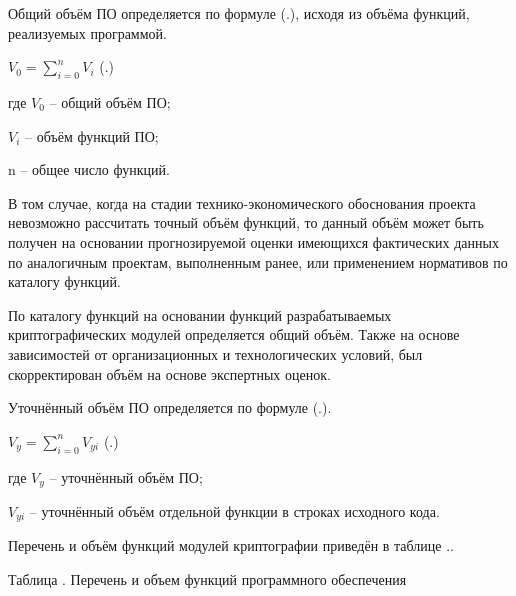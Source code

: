 \subtitlespace

{\gostFont
	
	\par \redline Общий объём ПО определяется по формуле (\thechaptercntr .\theformulacntr), исходя из объёма функций, реализуемых программой. 
	
	\formulaspace \par \redline 
	$V_0=\sum_{i=0}^{n}V_i$ 
	\hfill (\thechaptercntr .\theformulacntr) \redline
	\formulaspace \addtocounter{formulacntr}{1}

	\par \redline где $V_0$ {--} общий объём ПО;
	\par \redline \wherespace $V_i$ {--} объём функций ПО;
	\par \redline \wherespace n {--} общее число функций.
	
	\par \redline В том случае, когда на стадии технико-экономического обоснования проекта невозможно рассчитать точный объём функций, то данный объём может быть получен на основании прогнозируемой оценки имеющихся фактических данных по аналогичным проектам, выполненным ранее, или применением нормативов по каталогу функций.
	
	\par \redline По каталогу функций на основании функций разрабатываемых криптографических модулей определяется общий объём. Также на основе зависимостей от организационных и технологических условий, был скорректирован объём на основе экспертных оценок.
	
	\par \redline Уточнённый объём ПО определяется по формуле (\thechaptercntr .\theformulacntr).
	
	\formulaspace \par \redline 
	$V_y=\sum_{i=0}^{n}V_{yi}$ 
	\hfill (\thechaptercntr .\theformulacntr) \redline
	\formulaspace \addtocounter{formulacntr}{1}
	
	\par \redline где $V_y$ {--} уточнённый объём ПО;
	\par \redline \wherespace $V_{yi}$ {--} уточнённый объём отдельной функции в строках исходного кода.
	
	\par \redline Перечень и объём функций модулей криптографии приведён в таблице \thechaptercntr .\thetablecntr .

	\topTablespace
	\topTablespace
	{\begin{Center} 
		\par Таблица \thechaptercntr .\thetablecntr \spc {--} Перечень и объем функций программного обеспечения 


\end{Center}}}
